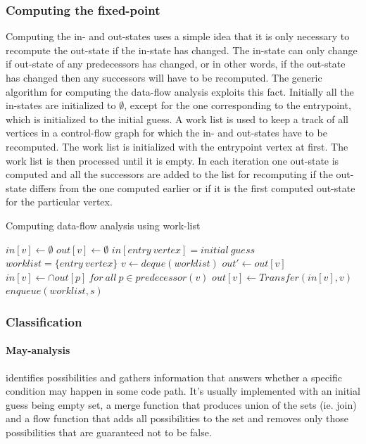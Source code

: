 \subsubsection{Computing the fixed-point}

Computing the in- and out-states uses a simple idea that it is only necessary to recompute the out-state if the in-state has changed. The in-state can only change if out-state of any predecessors has changed, or in other words, if the out-state has changed then any successors will have to be recomputed. The generic algorithm for computing the data-flow analysis exploits this fact. Initially all the in-states are initialized to $\emptyset$, except for the one corresponding to the entrypoint, which is initialized to the initial guess. A work list is used to keep a track of all vertices in a control-flow graph for which the in- and out-states have to be recomputed. The work list is initialized with the entrypoint vertex at first. The work list is then processed until it is empty. In each iteration one out-state is computed and all the successors are added to the list for recomputing if the out-state differs from the one computed earlier or if it is the first computed out-state for the particular vertex.

\begin{myalgorithm}
\caption{Computing data-flow analysis using work-list}
\begin{algorithmic}
	\STATE $in[v] \gets \emptyset$
	\STATE $out[v] \gets \emptyset$
\ENDFOR
\STATE $in[entry\ vertex] = initial\ guess$
\STATE $worklist = \{entry\ vertex\}$
	\STATE $v \gets deque(worklist)$
	\STATE $out' \gets out[v]$
	\STATE $in[v] \gets \cap out[p]\ for\ all\ p \in predecessor(v)$
	\STATE $out[v] \gets Transfer(in[v], v)$
				\STATE $enqueue(worklist, s)$
			\ENDIF
		\ENDFOR
	\ENDIF
\ENDWHILE
\end{algorithmic}
\end{myalgorithm}

\subsubsection{Classification}

\paragraph{May-analysis} identifies possibilities and gathers information that answers whether a specific condition may happen in some code path. It's usually implemented with an initial guess being empty set, a merge function that produces union of the sets (ie. join) and a flow function that adds all possibilities to the set and removes only those possibilities that are guaranteed not to be false.

